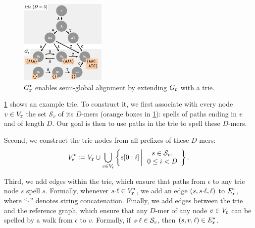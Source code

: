 \begin{figure}
	\centering
	\includegraphics[width=\linewidth]{./figs/tree}
	\caption{$G_\texttt{r}^\texttt{+}$ enables semi-global alignment by extending $G_\texttt{r}$ with a trie.}
	\label{fig:trie}
	\vspace{-25pt}
\end{figure}
\cref{fig:trie} shows an example trie. To construct it, we first associate with
every node $v \in V_\texttt{r}$ the set $\mathcal{S}_v$ of its $D$-mers (orange boxes in
\cref{fig:trie}): spells of paths ending in $v$ and of length $D$. Our goal is
then to use paths in the trie to spell these $D$-mers.

Second, we construct the trie nodes from all prefixes of these $D$-mers:
%
$$ V_\texttt{r}^\texttt{+}:= V_\texttt{r} \cup
\bigcup_{v \in V_\texttt{r}} \left\{s[0:i] \,\middle|\, \begin{array}{c}
	s \in \mathcal{S}_v, \\
	0 \leq i < D
\end{array} \right\}.
$$

Third, we add edges within the trie, which ensure that paths from $\epsilon$ to
any trie node $s$ spell $s$. Formally, whenever $s {\cdot} \ell \in V_\texttt{r}^\texttt{+}$, we add
an edge $(s,s {\cdot} \ell, \ell)$ to $E_\texttt{r}^\texttt{+}$, where ``${\cdot}$'' denotes string
concatenation.
%
Finally, we add edges between the trie and the reference graph, which ensure
that any $D$-mer of any node $v \in V_\texttt{r}$ can be spelled by a walk from
$\epsilon$ to $v$. Formally, if $s {\cdot} \ell \in \mathcal{S}_v$, then
$(s,v,\ell) \in E_\texttt{r}^\texttt{+}$.

